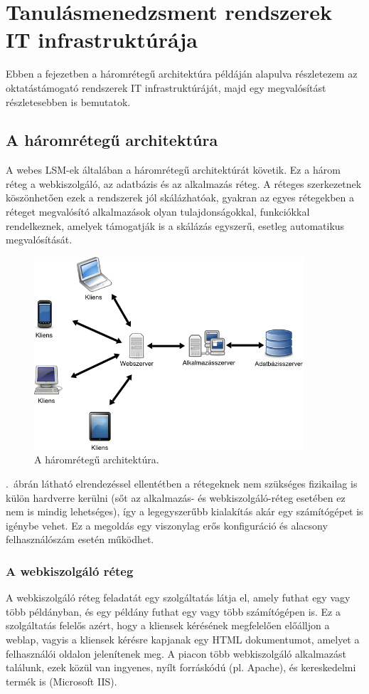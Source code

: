 \chapter{Tanulásmenedzsment rendszerek IT infrastruktúrája}

Ebben a fejezetben a háromrétegű architektúra példáján alapulva részletezem az oktatástámogató rendszerek IT infrastruktúráját, majd egy megvalósítást részletesebben is bemutatok. 

\section{A háromrétegű architektúra}
A webes LSM-ek általában a háromrétegű architektúrát követik. Ez a három réteg a webkiszolgáló, az adatbázis és az alkalmazás réteg. A réteges szerkezetnek köszönhetően ezek a rendszerek jól skálázhatóak, gyakran az egyes rétegekben a réteget megvalósító alkalmazások olyan tulajdonságokkal, funkciókkal rendelkeznek, amelyek támogatják is a skálázás egyszerű, esetleg automatikus megvalósítását.

\begin{figure}[!ht]
\centering
\includegraphics[width=100mm, keepaspectratio]{figures/3tier_simple_001.png}
\caption{A háromrétegű architektúra.}
\label{fig:3tier_simple_001}
\end{figure}

.~ábrán látható elrendezéssel ellentétben a rétegeknek nem szükséges fizikailag is külön hardverre kerülni (sőt az alkalmazás- és webkiszolgáló-réteg esetében ez nem is mindig lehetséges), így a legegyszerűbb kialakítás akár egy számítógépet is igénybe vehet. Ez a megoldás egy viszonylag erős konfiguráció és alacsony felhasználószám esetén működhet.

\subsection{A webkiszolgáló réteg}
A webkiszolgáló réteg feladatát egy szolgáltatás látja el, amely futhat egy vagy több példányban, és egy példány futhat egy vagy több számítógépen is. Ez a szolgáltatás felelős azért, hogy a kliensek kérésének megfelelően előálljon a weblap, vagyis a kliensek kérésre kapjanak egy HTML dokumentumot, amelyet a felhasználói oldalon jelenítenek meg.
A piacon több webkiszolgáló alkalmazást találunk, ezek közül van ingyenes, nyílt forráskódú (pl. Apache), és kereskedelmi termék is (Microsoft IIS).

